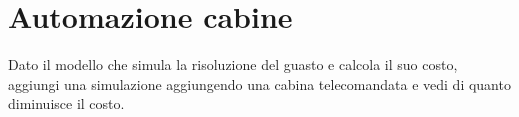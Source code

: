 \chapter{Automazione cabine}


Dato il modello che simula la risoluzione del guasto e calcola il suo costo, aggiungi una simulazione aggiungendo una cabina telecomandata e vedi di quanto diminuisce il costo.